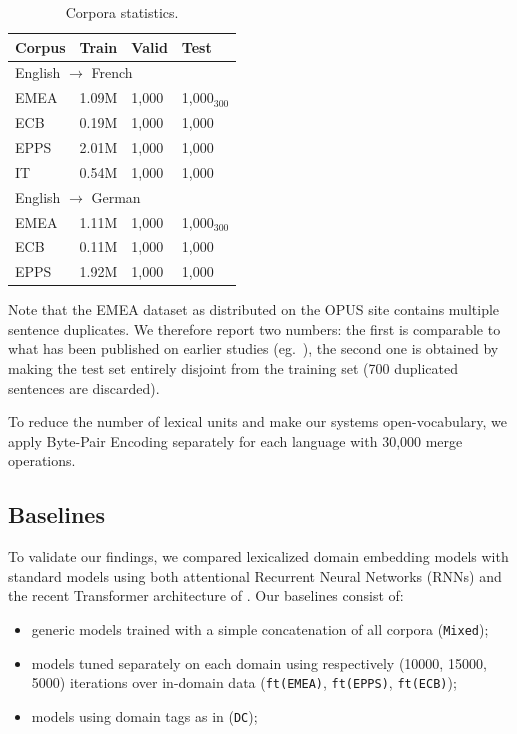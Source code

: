 \documentclass[a4paper]{article}
\newcommand{\fyDone}[1]{\done[FY]\Todo[FY:]{\textcolor{orange}{#1}}}
\newcommand{\jcTodo}[1]{\Todo[JC:]{\textcolor{orange}{#1}}}
\begin{document}
\fyDone{Check which corpus are useful}
\begin{table}[h]
  \centering
  \begin{tabular}{ |llll|} %
    \hline
    Corpus & Train & Valid & Test \\ 
    \hline
    \multicolumn{4}{l}{English $\rightarrow$ French }\\
    \hline
    EMEA  & 1.09M & 1,000 & 1,000$_{300}$\\
    ECB    & 0.19M & 1,000 & 1,000     \\
    EPPS   & 2.01M  & 1,000 & 1,000  \\
    IT         & 0.54M  & 1,000 & 1,000 \\  
    \hline
    \multicolumn{4}{l}{English $\rightarrow$ German}\\
    \hline
    EMEA  & 1.11M & 1,000 & 1,000$_{300}$ \\
    ECB     &  0.11M & 1,000 & 1,000  \\
    EPPS   & 1.92M & 1,000 & 1,000 \\ 
    \hline
\end{tabular}
\caption{Corpora statistics.}
\label{tab:Corpora}
\end{table}

\jcTodo{I delete vocabs since they make no sense if computed after BPE}

Note that the EMEA dataset as distributed on the OPUS site contains multiple sentence duplicates. 
We therefore report two numbers: the first is comparable to what has been published on earlier studies (eg.\ \cite{Zeng18multidomain}), the second one is obtained by making the test set entirely disjoint from the training set (700 duplicated sentences are discarded).

To reduce the number of lexical units and make our systems open-vocabulary, we apply Byte-Pair Encoding \cite{Sennrich16BPE} separately for each language with 30,000 merge operations. \fyDone{I need explanations here}

\subsection{Baselines \label{ssec:baselines}}
To validate our findings, we compared lexicalized domain embedding models with standard models using both attentional Recurrent Neural Networks (RNNs) \cite{Bahdanau15learning} and the recent Transformer architecture of \cite{Vaswani17attention}. Our baselines consist of:
\begin{itemize}
\item generic models trained with a simple concatenation of all corpora (\texttt{Mixed}); 
\item models tuned separately on each domain using respectively (10000, 15000, 5000) iterations over in-domain data (\texttt{ft(EMEA)}, \texttt{ft(EPPS)}, \texttt{ft(ECB)}); 
\item models using domain tags as in \cite{Kobus17domaincontrol} (\texttt{DC}); 
\end{itemize}
\end{document}
